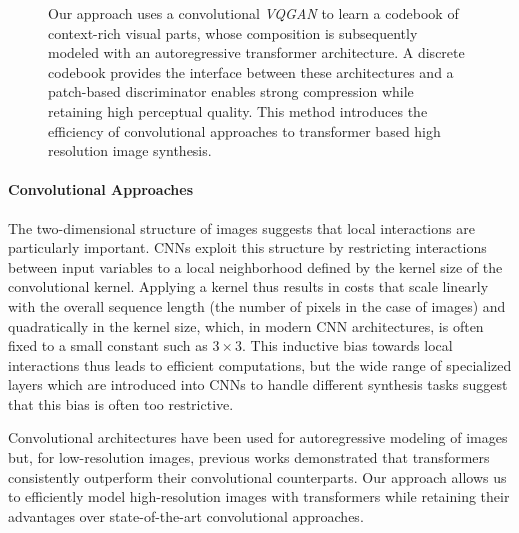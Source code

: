 \begin{figure}
		\centering

  \caption{Our approach uses a convolutional \emph{VQGAN} to learn a codebook of context-rich visual parts, whose composition is subsequently modeled with an autoregressive transformer architecture. A discrete codebook provides the interface between these architectures and a patch-based discriminator enables strong compression while retaining high perceptual quality. This method introduces the efficiency of convolutional approaches to transformer based high resolution image synthesis.}
	\label{fig:model}
	\end{figure}

\paragraph{Convolutional Approaches} The two-dimensional structure of images suggests that local interactions are particularly important. CNNs exploit this structure by restricting interactions between input variables to a local neighborhood defined by the kernel size of the convolutional kernel. Applying a kernel thus results in costs that scale linearly with the overall sequence length (the number of pixels in the case of images) and quadratically in the kernel size, which, in modern CNN architectures, is often fixed to a small constant such as
$3\times3$. This inductive bias towards local interactions thus leads to efficient computations, but the wide range of specialized layers which are introduced into CNNs to handle different synthesis tasks \cite{park2019semantic,zhang2020cross,Siarohin_2019_NeurIPS,zhu2019sean,zhou2017view} suggest that this bias is often too restrictive.

Convolutional architectures have been used for autoregressive modeling of images \cite{oord2016pixel,oord2016conditional,chen2018pixelsnail} but, for low-resolution images, previous works \cite{parmar2018image,child2019generating,ho2019axial} demonstrated that transformers consistently outperform their convolutional counterparts. Our approach allows us to efficiently model high-resolution images with transformers while retaining their advantages over state-of-the-art convolutional approaches.

